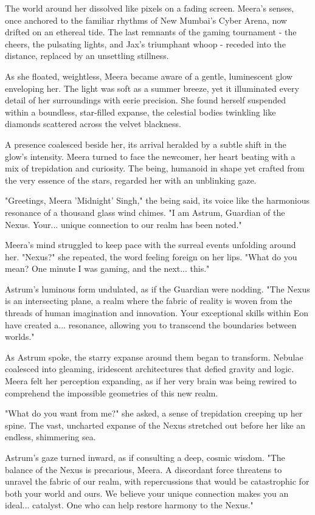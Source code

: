 \documentclass[12pt]{book}
\begin{document}
The world around her dissolved like pixels on a fading screen. Meera's
senses, once anchored to the familiar rhythms of New Mumbai's Cyber
Arena, now drifted on an ethereal tide. The last remnants of the gaming
tournament - the cheers, the pulsating lights, and Jax's triumphant
whoop - receded into the distance, replaced by an unsettling stillness.

As she floated, weightless, Meera became aware of a gentle, luminescent
glow enveloping her. The light was soft as a summer breeze, yet it
illuminated every detail of her surroundings with eerie precision. She
found herself suspended within a boundless, star-filled expanse, the
celestial bodies twinkling like diamonds scattered across the velvet
blackness.

A presence coalesced beside her, its arrival heralded by a subtle shift
in the glow's intensity. Meera turned to face the newcomer, her heart
beating with a mix of trepidation and curiosity. The being, humanoid in
shape yet crafted from the very essence of the stars, regarded her with
an unblinking gaze.

"Greetings, Meera 'Midnight' Singh," the being said, its voice like the
harmonious resonance of a thousand glass wind chimes. "I am Astrum,
Guardian of the Nexus. Your... unique connection to our realm has been
noted."

Meera's mind struggled to keep pace with the surreal events unfolding
around her. "Nexus?" she repeated, the word feeling foreign on her lips.
"What do you mean? One minute I was gaming, and the next... this."

Astrum's luminous form undulated, as if the Guardian were nodding. "The
Nexus is an intersecting plane, a realm where the fabric of reality is
woven from the threads of human imagination and innovation. Your
exceptional skills within Eon have created a... resonance, allowing you
to transcend the boundaries between worlds."

As Astrum spoke, the starry expanse around them began to transform.
Nebulae coalesced into gleaming, iridescent architectures that defied
gravity and logic. Meera felt her perception expanding, as if her very
brain was being rewired to comprehend the impossible geometries of this
new realm.

"What do you want from me?" she asked, a sense of trepidation creeping
up her spine. The vast, uncharted expanse of the Nexus stretched out
before her like an endless, shimmering sea.

Astrum's gaze turned inward, as if consulting a deep, cosmic wisdom.
"The balance of the Nexus is precarious, Meera. A discordant force
threatens to unravel the fabric of our realm, with repercussions that
would be catastrophic for both your world and ours. We believe your
unique connection makes you an ideal... catalyst. One who can help
restore harmony to the Nexus."
\end{document}
